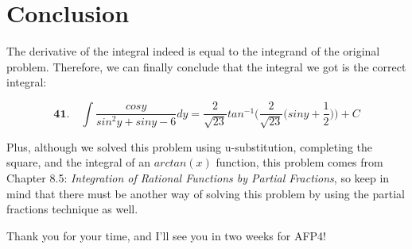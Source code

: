 \section*{Conclusion}

The derivative of the integral indeed 
is equal to the integrand of the original problem. 
Therefore, we can finally conclude that the integral
we got is the correct integral:

\begin{equation*}
	\textbf{41.}\quad \int \frac{cosy}{sin^2y+siny-6} dy =	
	\frac{2}{\sqrt{23}} tan^{-1}\bigg(
	\frac{2}{\sqrt{23}}\big(
	siny+\frac{1}{2}
	\big)
	\bigg) + C
\end{equation*}

Plus, although we solved this problem
using u-substitution, completing the square,
and the integral of an $ arctan(x) $ function,
this problem comes from Chapter 8.5: 
\textit{Integration of Rational Functions
by Partial Fractions}, so keep in mind that
there must be another way of solving this problem by
using the partial fractions technique as well.

Thank you for your time, and I'll see you in two weeks
for AFP4!